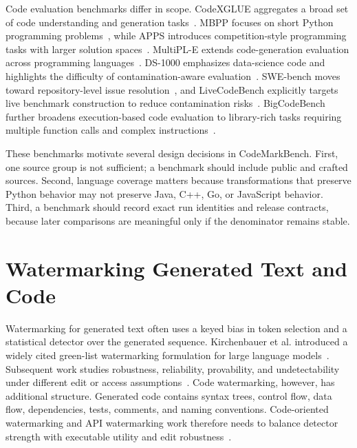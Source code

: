 Code evaluation benchmarks differ in scope. CodeXGLUE aggregates a broad set of code understanding and generation tasks~\cite{lu2021codexglue}. MBPP focuses on short Python programming problems~\cite{austin2021mbpp}, while APPS introduces competition-style programming tasks with larger solution spaces~\cite{hendrycks2021apps}. MultiPL-E extends code-generation evaluation across programming languages~\cite{cassano2022multiple}. DS-1000 emphasizes data-science code and highlights the difficulty of contamination-aware evaluation~\cite{lai2023ds1000}. SWE-bench moves toward repository-level issue resolution~\cite{jimenez2024swebench}, and LiveCodeBench explicitly targets live benchmark construction to reduce contamination risks~\cite{jain2024livecodebench}. BigCodeBench further broadens execution-based code evaluation to library-rich tasks requiring multiple function calls and complex instructions~\cite{zhuo2025bigcodebench}.

These benchmarks motivate several design decisions in CodeMarkBench. First, one source group is not sufficient; a benchmark should include public and crafted sources. Second, language coverage matters because transformations that preserve Python behavior may not preserve Java, C++, Go, or JavaScript behavior. Third, a benchmark should record exact run identities and release contracts, because later comparisons are meaningful only if the denominator remains stable.

\section{Watermarking Generated Text and Code}

Watermarking for generated text often uses a keyed bias in token selection and a statistical detector over the generated sequence. Kirchenbauer et al. introduced a widely cited green-list watermarking formulation for large language models~\cite{kirchenbauer2023watermark}. Subsequent work studies robustness, reliability, provability, and undetectability under different edit or access assumptions~\cite{zhao2024provable,kirchenbauer2024reliability,christ2024undetectable}. Code watermarking, however, has additional structure. Generated code contains syntax trees, control flow, data flow, dependencies, tests, comments, and naming conventions. Code-oriented watermarking and API watermarking work therefore needs to balance detector strength with executable utility and edit robustness~\cite{li2023protecting,lee2024who,suresh2024robust}.

